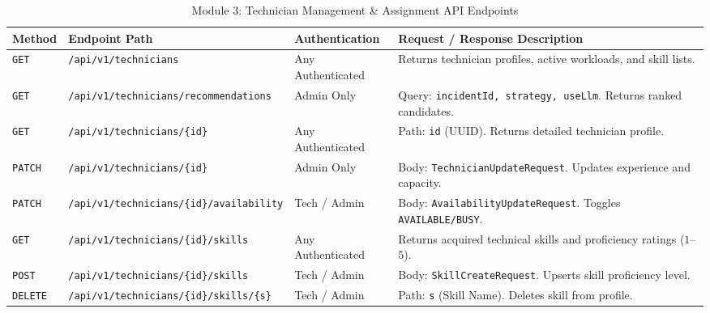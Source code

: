 \documentclass[11pt,a4paper,oneside]{report}
\begin{document}
\begin{table}[H]
\centering
\scriptsize
\caption{Module 3: Technician Management \& Assignment API Endpoints}
\label{tab:app_routes_m3}
\begin{tabular}{p{1.2cm}p{5.5cm}p{2.5cm}p{5.0cm}}
\toprule
\textbf{Method} & \textbf{Endpoint Path} & \textbf{Authentication} & \textbf{Request / Response Description} \\
\midrule
\texttt{GET} & \texttt{/api/v1/technicians} & Any Authenticated & Returns technician profiles, active workloads, and skill lists. \\
\texttt{GET} & \texttt{/api/v1/technicians/recommendations}& Admin Only & Query: \texttt{incidentId, strategy, useLlm}. Returns ranked candidates. \\
\texttt{GET} & \texttt{/api/v1/technicians/\{id\}} & Any Authenticated & Path: \texttt{id} (UUID). Returns detailed technician profile. \\
\texttt{PATCH} & \texttt{/api/v1/technicians/\{id\}} & Admin Only & Body: \texttt{TechnicianUpdateRequest}. Updates experience and capacity. \\
\texttt{PATCH} & \texttt{/api/v1/technicians/\{id\}/availability}& Tech / Admin & Body: \texttt{AvailabilityUpdateRequest}. Toggles \texttt{AVAILABLE/BUSY}. \\
\texttt{GET} & \texttt{/api/v1/technicians/\{id\}/skills} & Any Authenticated & Returns acquired technical skills and proficiency ratings ($1$--$5$). \\
\texttt{POST} & \texttt{/api/v1/technicians/\{id\}/skills} & Tech / Admin & Body: \texttt{SkillCreateRequest}. Upserts skill proficiency level. \\
\texttt{DELETE} & \texttt{/api/v1/technicians/\{id\}/skills/\{s\}}& Tech / Admin & Path: \texttt{s} (Skill Name). Deletes skill from profile. \\
\bottomrule
\end{tabular}
\end{table}
\end{document}
